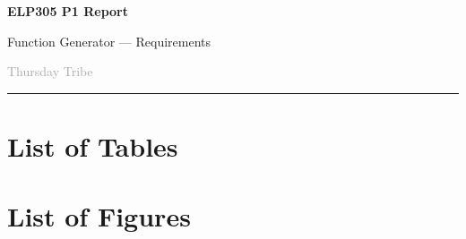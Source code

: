\documentclass[a4paper,12pt]{article}
\begin{document}
% 
% 
% 


\begin{center}
    {\Huge\textbf{ELP305 P1 Report}\par}
    \vspace{0.15cm}
    {\Large Function Generator --- Requirements\par}    
    \vspace{0.1cm}
    \large \textcolor{darkgray}{Thursday Tribe}
\end{center}

\hspace{-0.31in}
\rule{1.03\linewidth}{0.4pt}


\begin{figure}[H]
\end{figure}




\tableofcontents

\newpage
\section{List of Tables}
\listoftables

\newpage
\section{List of Figures}
\listoffigures


\end{document}
